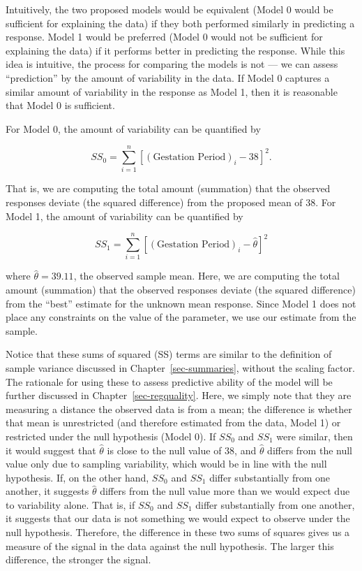 \documentclass[
  letterpaper,
  DIV=11,
  numbers=noendperiod]{scrreprt}
\theoremstyle{plain}
\theoremstyle{definition}
\theoremstyle{definition}
\theoremstyle{remark}
\begin{document}
Intuitively, the two proposed models would be equivalent (Model 0 would
be sufficient for explaining the data) if they both performed similarly
in predicting a response. Model 1 would be preferred (Model 0 would not
be sufficient for explaining the data) if it performs better in
predicting the response. While this idea is intuitive, the process for
comparing the models is not --- we can assess ``prediction'' by the
amount of variability in the data. If Model 0 captures a similar amount
of variability in the response as Model 1, then it is reasonable that
Model 0 is sufficient.

For Model 0, the amount of variability can be quantified by

\[SS_0 = \sum_{i=1}^{n} \left[(\text{Gestation Period})_i - 38\right]^2.\]

That is, we are computing the total amount (summation) that the observed
responses deviate (the squared difference) from the proposed mean of 38.
For Model 1, the amount of variability can be quantified by

\[SS_1 = \sum_{i=1}^{n} \left[(\text{Gestation Period})_i - \widehat{\theta}\right]^2\]

where \(\widehat{\theta} = 39.11\), the observed sample mean. Here, we
are computing the total amount (summation) that the observed responses
deviate (the squared difference) from the ``best'' estimate for the
unknown mean response. Since Model 1 does not place any constraints on
the value of the parameter, we use our estimate from the sample.

Notice that these sums of squared (SS) terms are similar to the
definition of sample variance discussed in Chapter~\ref{sec-summaries},
without the scaling factor. The rationale for using these to assess
predictive ability of the model will be further discussed in
Chapter~\ref{sec-regquality}. Here, we simply note that they are
measuring a distance the observed data is from a mean; the difference is
whether that mean is unrestricted (and therefore estimated from the
data, Model 1) or restricted under the null hypothesis (Model 0). If
\(SS_0\) and \(SS_1\) were similar, then it would suggest that
\(\widehat{\theta}\) is close to the null value of 38, and
\(\widehat{\theta}\) differs from the null value only due to sampling
variability, which would be in line with the null hypothesis. If, on the
other hand, \(SS_0\) and \(SS_1\) differ substantially from one another,
it suggests \(\widehat{\theta}\) differs from the null value more than
we would expect due to variability alone. That is, if \(SS_0\) and
\(SS_1\) differ substantially from one another, it suggests that our
data is not something we would expect to observe under the null
hypothesis. Therefore, the difference in these two sums of squares gives
us a measure of the signal in the data against the null hypothesis. The
larger this difference, the stronger the signal.
\end{document}
